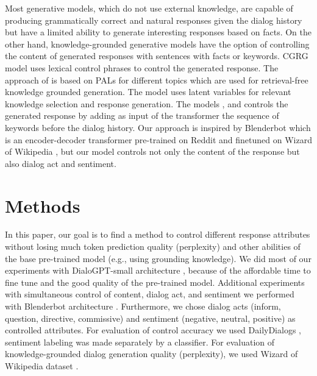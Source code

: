 \documentclass[11pt]{article}
\begin{document}
Most generative models, which do not use external knowledge, are capable of producing grammatically correct and natural responses given the dialog history but have a limited ability to generate interesting responses based on facts. On the other hand, knowledge-grounded generative models have the option of controlling the content of generated responses with sentences with facts or keywords. CGRG \cite{wu2021controllable} model uses lexical control phrases to control the generated response. The approach of \cite{xu2021retrieval} is based on PALs for different topics which are used for retrieval-free knowledge grounded generation. The model \cite{zhan2021colv} uses latent variables for relevant knowledge selection and response generation. The models \cite{xu2021generating}, \cite{kumar2021controllable} and \cite{gupta2020controlling} controls the generated response by adding as input of the transformer the sequence of keywords before the dialog history. Our approach is inspired by Blenderbot \cite{roller2020recipes} which is an encoder-decoder transformer pre-trained on Reddit and finetuned on Wizard of Wikipedia \cite{dinan2018wizard}, but our model controls not only the content of the response but also dialog act and sentiment.

\section{Methods}
In this paper, our goal is to find a method to control different response attributes without losing much token prediction quality (perplexity) and other abilities of the base pre-trained model (e.g., using grounding knowledge). We did most of our experiments with   DialoGPT-small architecture \cite{zhang2020dialogpt}, because of the affordable time to fine tune and the good quality of the pre-trained model. 
Additional experiments with simultaneous control of content, dialog act, and sentiment we performed with Blenderbot architecture \cite{roller2020recipes}.
Furthermore, we chose dialog acts (inform, question, directive, commissive) and sentiment (negative, neutral, positive) as controlled attributes. For evaluation of control accuracy we used DailyDialogs \cite{li2017dailydialog}, sentiment labeling was made separately by a classifier. For evaluation of knowledge-grounded dialog generation quality (perplexity), we used Wizard of Wikipedia dataset \cite{dinan2018wizard}.
\end{document}
